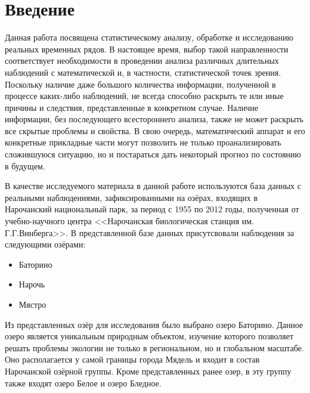 \newpage

\chapter*{Введение}

Данная работа посвящена статистическому анализу, обработке и исследованию реальных временных рядов. В настоящее время, выбор такой направленности соответствует необходимости в проведении анализа различных длительных наблюдений с математической и, в частности, статистической точек зрения. Поскольку наличие даже большого количества информации, полученной в процессе каких-либо наблюдений, не всегда способно раскрыть те или иные причины и следствия, представленные в конкретном случае. Наличие информации, без последующего всестороннего анализа, также не может раскрыть все скрытые проблемы и свойства. В свою очередь, математический аппарат и его конкретные прикладные части могут позволить не только проанализировать сложившуюся ситуацию, но и постараться дать некоторый прогноз по состоянию в будущем.

В качестве исследуемого материала в данной работе используются база данных с реальными наблюдениями, зафиксированными на озёрах, входящих в Нарочанский национальный парк, за период с 1955 по 2012 годы, полученная от учебно-научного центра <<Нарочанская биологическая станция им. Г.Г.Винберга>>. В представленной базе данных присутсвовали наблюдения за следующими озёрами:
\begin{itemize}
\item Баторино
\item Нарочь
\item Мястро
\end{itemize}
Из представленных озёр для исследования было выбрано озеро Баторино. Данное озеро является уникальным природным объектом, изучение которого позволяет решать проблемы экологии не только в региональном, но и глобальном масштабе. Оно располагается у самой границы города Мядель и входит в состав Нарочанской озёрной группы. Кроме представленных ранее озер, в эту группу также входят озеро Белое и озеро Бледное.

